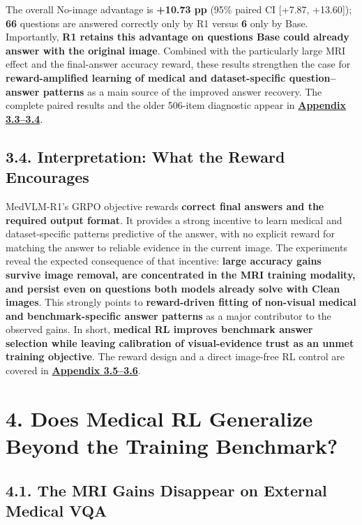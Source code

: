 \documentclass[
  10pt,
  a4paper,
]{article}
\begin{document}
The overall No-image advantage is \textbf{+10.73 pp} (95\% paired CI
{[}+7.87, +13.60{]}); \textbf{66} questions are answered correctly only
by R1 versus \textbf{6} only by Base. Importantly, \textbf{R1 retains
this advantage on questions Base could already answer with the original
image}. Combined with the particularly large MRI effect and the
final-answer accuracy reward, these results strengthen the case for
\textbf{reward-amplified learning of medical and dataset-specific
question--answer patterns} as a main source of the improved answer
recovery. The complete paired results and the older 506-item diagnostic
appear in
\textbf{\hyperref[matched-559-item-joint-clean-correct-subset]{Appendix
3.3--3.4}}.

\subsection{3.4. Interpretation: What the Reward
Encourages}\label{interpretation-what-the-reward-encourages}

MedVLM-R1's GRPO objective rewards \textbf{correct final answers and the
required output format}. It provides a strong incentive to learn medical
and dataset-specific patterns predictive of the answer, with no explicit
reward for matching the answer to reliable evidence in the current
image. The experiments reveal the expected consequence of that
incentive: \textbf{large accuracy gains survive image removal, are
concentrated in the MRI training modality, and persist even on questions
both models already solve with Clean images}. This strongly points to
\textbf{reward-driven fitting of non-visual medical and
benchmark-specific answer patterns} as a major contributor to the
observed gains. In short, \textbf{medical RL improves benchmark answer
selection while leaving calibration of visual-evidence trust as an unmet
training objective}. The reward design and a direct image-free RL
control are covered in
\textbf{\hyperref[why-the-medvlm-r1-reward-motivates-a-non-visual-prior-hypothesis]{Appendix
3.5--3.6}}.

\section{4. Does Medical RL Generalize Beyond the Training
Benchmark?}\label{does-medical-rl-generalize-beyond-the-training-benchmark}

\subsection{4.1. The MRI Gains Disappear on External Medical
VQA}\label{the-mri-gains-disappear-on-external-medical-vqa}
\end{document}
